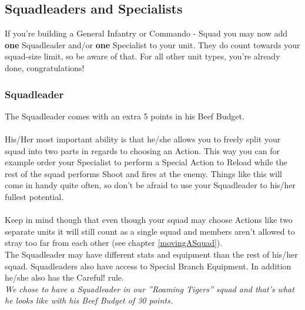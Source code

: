 \documentclass[
	11pt,
	toc=bibliography
	]{article}
\begin{document}
\subsection{Squadleaders and Specialists}
If you're building a General Infantry or Commando - Squad you may now add \textbf{one} Squadleader and/or \textbf{one} Specialist to your unit. They do count towards your squad-size limit, so be aware of that. For all other unit types, you're already done, congratulations!

\subsubsection*{Squadleader}
The Squadleader comes with an extra 5 points in his Beef Budget. \\\\
His/Her most important ability is that he/she allows you to freely split your squad into two parts in regards to choosing an Action. This way you can for example order your Specialist to perform a Special Action to Reload while the rest of the squad performs Shoot and fires at the enemy. Things like this will come in handy quite often, so don't be afraid to use your Squadleader to his/her fullest potential. \\\\
Keep in mind though that even though your squad may choose Actions like two separate units it will still count as a single squad and members aren't allowed to stray too far from each other (see chapter \ref{movingASquad}).\\

The Squadleader may have different stats and equipment than the rest of his/her squad. Squadleaders also have access to Special Branch Equipment. In addition he/she also has the Careful! rule.\\

\textit{We chose to have a Squadleader in our ''Roaming Tigers'' squad and that's what he looks like with his Beef Budget of 30 points.}
\end{document}
